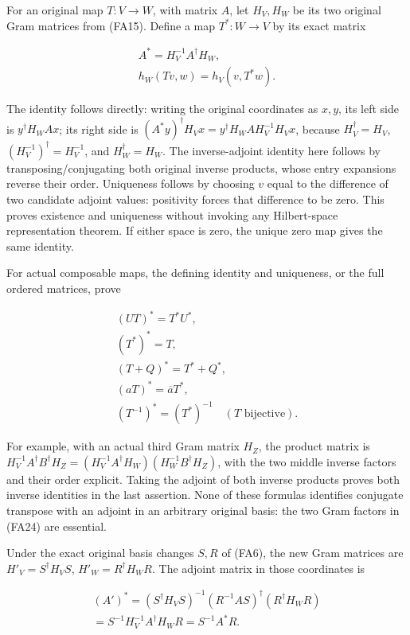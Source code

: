 \documentclass[
  11pt,
]{article}
\begin{document}
For an original map \(T:V\to W\), with matrix \(A\), let \(H_V,H_W\) be
its two original Gram matrices from (FA15). Define a map \(T^*:W\to V\)
by its exact matrix

\[
\begin{gathered}
A^*=H_V^{-1}A^\dagger H_W, \\ h_W(Tv,w)=h_V(v,T^*w).
\end{gathered}
\tag{FA24}
\]

The identity follows directly: writing the original coordinates as
\(x,y\), its left side is \(y^\dagger H_WAx\); its right side is
\((A^*y)^\dagger H_Vx=y^\dagger H_W A H_V^{-1}H_Vx\), because
\(H_V^\dagger=H_V\), \((H_V^{-1})^\dagger=H_V^{-1}\), and
\(H_W^\dagger=H_W\). The inverse-adjoint identity here follows by
transposing/conjugating both original inverse products, whose entry
expansions reverse their order. Uniqueness follows by choosing \(v\)
equal to the difference of two candidate adjoint values: positivity
forces that difference to be zero. This proves existence and uniqueness
without invoking any Hilbert-space representation theorem. If either
space is zero, the unique zero map gives the same identity.

For actual composable maps, the defining identity and uniqueness, or the
full ordered matrices, prove

\[
\begin{gathered}
(UT)^*=T^*U^*, \\  (T^*)^*=T, \\ 
(T+Q)^*=T^*+Q^*, \\  (aT)^*=\overline a T^*, \\ (T^{-1})^*=(T^*)^{-1}\quad(T\text{ bijective}).
\end{gathered}
\tag{FA25}
\]

For example, with an actual third Gram matrix \(H_Z\), the product
matrix is
\(H_V^{-1}A^\dagger B^\dagger H_Z=(H_V^{-1}A^\dagger H_W)(H_W^{-1}B^\dagger H_Z)\),
with the two middle inverse factors and their order explicit. Taking the
adjoint of both inverse products proves both inverse identities in the
last assertion. None of these formulas identifies conjugate transpose
with an adjoint in an arbitrary original basis: the two Gram factors in
(FA24) are essential.

Under the exact original basis changes \(S,R\) of (FA6), the new Gram
matrices are \(H'_V=S^\dagger H_VS\), \(H'_W=R^\dagger H_WR\). The
adjoint matrix in those coordinates is

\[
\begin{gathered}
(A')^*=(S^\dagger H_VS)^{-1}(R^{-1}AS)^\dagger
                        (R^\dagger H_WR) \\  =S^{-1}H_V^{-1}A^\dagger H_WR=S^{-1}A^*R.
\end{gathered}
\tag{FA26}
\]
\end{document}
